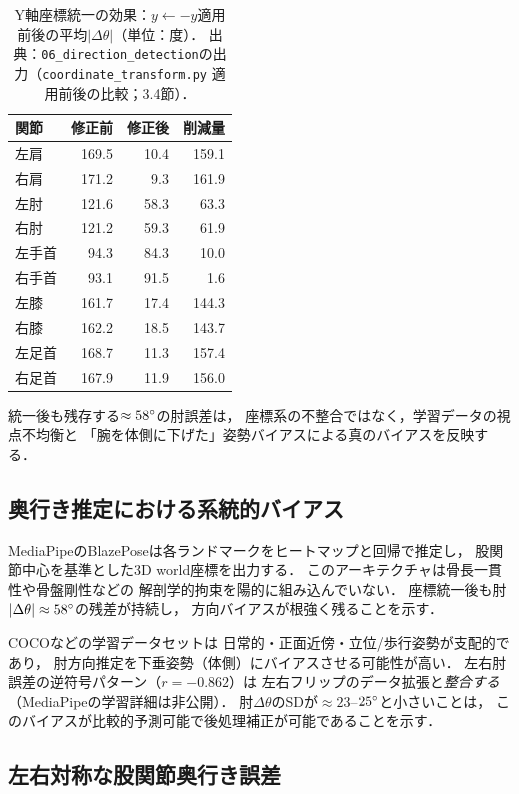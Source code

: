 \documentclass[twocolumn]{article}
\begin{document}
\begin{table}[!t]
\centering
\caption{Y軸座標統一の効果：$y \leftarrow -y$適用前後の平均$|\Delta\theta|$（単位：度）．
  出典：\texttt{06\_direction\_detection}の出力（\texttt{coordinate\_transform.py}
  適用前後の比較；3.4節）．}
\label{tab:yflip_effect}
\small
\begin{tabular}{lrrr}
\toprule
関節     & 修正前 & 修正後 & 削減量 \\
\midrule
左肩  & 169.5 & 10.4 & 159.1 \\
右肩  & 171.2 &  9.3 & 161.9 \\
左肘  & 121.6 & 58.3 &  63.3 \\
右肘  & 121.2 & 59.3 &  61.9 \\
左手首 &  94.3 & 84.3 &  10.0 \\
右手首 &  93.1 & 91.5 &   1.6 \\
左膝  & 161.7 & 17.4 & 144.3 \\
右膝  & 162.2 & 18.5 & 143.7 \\
左足首 & 168.7 & 11.3 & 157.4 \\
右足首 & 167.9 & 11.9 & 156.0 \\
\bottomrule
\end{tabular}
\end{table}

統一後も残存する$\approx58\degree{}$の肘誤差は，
座標系の不整合ではなく，学習データの視点不均衡と
「腕を体側に下げた」姿勢バイアスによる真のバイアスを反映する．

\subsection{奥行き推定における系統的バイアス}

MediaPipeのBlazePoseは各ランドマークをヒートマップと回帰で推定し，
股関節中心を基準とした3D world座標を出力する\cite{blazepose}．
このアーキテクチャは骨長一貫性や骨盤剛性などの
解剖学的拘束を陽的に組み込んでいない．
座標統一後も肘$|\Delta\theta|\approx58\degree{}$の残差が持続し，
方向バイアスが根強く残ることを示す．

COCO\cite{coco}などの学習データセットは
日常的・正面近傍・立位/歩行姿勢が支配的であり，
肘方向推定を下垂姿勢（体側）にバイアスさせる可能性が高い．
左右肘誤差の逆符号パターン（$r=-0.862$）は
左右フリップのデータ拡張と\emph{整合する}（MediaPipeの学習詳細は非公開）．
肘$\Delta\theta$のSDが$\approx23$--$25\degree{}$と小さいことは，
このバイアスが比較的予測可能で後処理補正が可能であることを示す．

\subsection{左右対称な股関節奥行き誤差}
\end{document}
